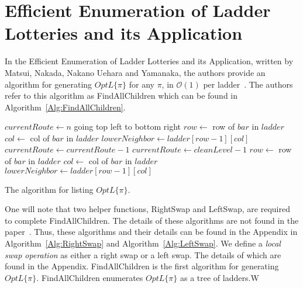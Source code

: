 \section{Efficient Enumeration of Ladder Lotteries and its Application}

In the Efficient Enumeration of Ladder Lotteries and its Application, written by Matsui, Nakada, Nakano Uehara and Yamanaka,
the authors provide an algorithm for generating $OptL\{\pi\}$ 
for any $\pi$, in $\mathcal{O}(1)$ per ladder~\cite{A1}. The authors refer to this algorithm as {\sc FindAllChildren}
which can be found in Algorithm~\ref{Alg:FindAllChildren}. 
\begin{algorithm}[!htp]
	\begin{algorithmic}[1]
			\State $currentRoute \gets n$
				\State going top left to bottom right 
					\State $row \gets$ row of $bar$ in $ladder$ 
					\State $col \gets$ col of $bar$ in $ladder$
					\State $lowerNeighbor \gets ladder[row-1][col]$
					\EndIf
				\EndFor
				\State $currentRoute \gets currentRoute-1$
			\EndWhile
			\State $currentRoute \gets cleanLevel-1$
				\State $row \gets$ row of $bar$ in $ladder$ 
				\State $col \gets$ col of $bar$ in $ladder$
				\State $lowerNeighbor \gets ladder[row-1][col]$
				\EndIf
			\EndFor
		\EndFunction
	\end{algorithmic}
	\caption{The algorithm for listing $OptL\{\pi\}$.}
	\label{Alg:FindAllChildren}
\end{algorithm}
\pagebreak

One will note that two helper functions, {\sc RightSwap} and {\sc LeftSwap}, are required to complete 
{\sc FindAllChildren}. The details of these algorithms are not found 
in the paper~\cite{A1}. Thus, these algorithms and their details can be found in the Appendix in Algorithm~\ref{Alg:RightSwap}
and Algorithm~\ref{Alg:LeftSwap}. We define a \emph{local swap operation} as either a right swap or a left swap. The 
details of which are found in the Appendix. 
{\sc FindAllChildren} is the first algorithm for generating $OptL\{\pi\}$.\newline
{\sc FindAllChildren} enumerates $OptL\{\pi\}$ as a tree of ladders.W

